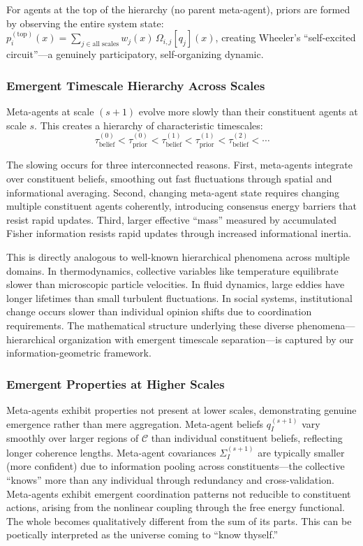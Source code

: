 \documentclass[11pt]{article}
\begin{document}
For agents at the top of the hierarchy (no parent meta-agent), priors are formed by observing the entire system state: $p_i^{(\text{top})}(x) = \sum_{j \in \text{all scales}} w_j(x) \, \Omega_{i,j}[q_j](x)$, creating Wheeler's ``self-excited circuit''---a genuinely participatory, self-organizing dynamic.

\subsubsection{Emergent Timescale Hierarchy Across Scales}

Meta-agents at scale $(s+1)$ evolve more slowly than their constituent agents at scale $s$. This creates a hierarchy of characteristic timescales:
\begin{equation}
\tau_{\text{belief}}^{(0)} < \tau_{\text{prior}}^{(0)} < \tau_{\text{belief}}^{(1)} < \tau_{\text{prior}}^{(1)} < \tau_{\text{belief}}^{(2)} < \cdots
\end{equation}

The slowing occurs for three interconnected reasons. First, meta-agents integrate over constituent beliefs, smoothing out fast fluctuations through spatial and informational averaging. Second, changing meta-agent state requires changing multiple constituent agents coherently, introducing consensus energy barriers that resist rapid updates. Third, larger effective ``mass'' measured by accumulated Fisher information resists rapid updates through increased informational inertia.

This is directly analogous to well-known hierarchical phenomena across multiple domains. In thermodynamics, collective variables like temperature equilibrate slower than microscopic particle velocities. In fluid dynamics, large eddies have longer lifetimes than small turbulent fluctuations. In social systems, institutional change occurs slower than individual opinion shifts due to coordination requirements. The mathematical structure underlying these diverse phenomena---hierarchical organization with emergent timescale separation---is captured by our information-geometric framework.

\subsubsection{Emergent Properties at Higher Scales}

Meta-agents exhibit properties not present at lower scales, demonstrating genuine emergence rather than mere aggregation. Meta-agent beliefs $q_I^{(s+1)}$ vary smoothly over larger regions of $\mathcal{C}$ than individual constituent beliefs, reflecting longer coherence lengths. Meta-agent covariances $\Sigma_I^{(s+1)}$ are typically smaller (more confident) due to information pooling across constituents---the collective ``knows'' more than any individual through redundancy and cross-validation. Meta-agents exhibit emergent coordination patterns not reducible to constituent actions, arising from the nonlinear coupling through the free energy functional. The whole becomes qualitatively different from the sum of its parts. This can be poetically interpreted as the universe coming to ``know thyself.''
\end{document}
